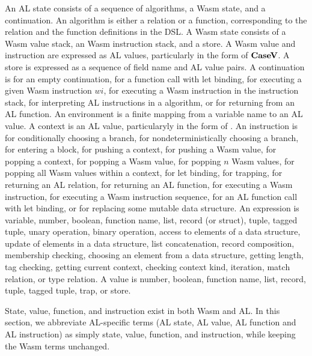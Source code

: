 An AL state consists of a sequence of algorithms, a Wasm state, and a
continuation.
An algorithm is either a relation or a function, corresponding to the relation
and the function definitions in the DSL.
A Wasm state consists of a Wasm value stack, an Wasm instruction stack, and a
store.
A Wasm value and instruction are expressed as AL values, particularly in the
form of $\textbf{CaseV}$.
A store is expressed as a sequence of field name and AL value pairs.
A continuation is \mt{} for an empty continuation, \call{} for a function call
with let binding, \exe{} for executing a given Wasm instruction $wi$, \wasm{}
for executing a Wasm instruction in the instruction stack, \algo{} for
interpreting AL instructions in a algorithm, or \ret{} for returning from an AL
function.
An environment is a finite mapping from a variable name to an AL value.
A context is an AL value, particularyly in the form of \casev{}.
An instruction is \ifi{} for conditionally choosing a branch, \eitheri{} for
nondeterministically choosing a branch, \enteri{} for entering a block,
\pushctxi{} for pushing a context, \pushi{} for pushing a Wasm value,
\popctxi{} for popping a context, \popi{} for popping a Wasm value, \popni{}
for popping $n$ Wasm values, \popalli{} for popping all Wasm values within a
context,  for let binding, \trapi{} for trapping, \returnreli{} for
returning an AL relation, \returnfunci{} for returning an AL function,
\executei{} for executing a Wasm instruction, \executeseqi{} for executing a
Wasm instruction sequence, \calli{} for an AL function call with let binding,
or \replacei{} for replacing some mutable data structure.
An expression is variable, number, boolean, function name, list, record (or
struct), tuple, tagged tuple, unary operation, binary operation, access to
elements of a data structure, update of elements in a data structure, list
concatenation, record composition, membership checking, choosing an element from
a data structure, getting length, tag checking, getting current context,
checking context kind, iteration, match relation, or type relation.
A value is number, boolean, function name, list, record, tuple, tagged tuple,
trap, or store.


State, value, function, and instruction exist in both Wasm and AL. In this
section, we abbreviate AL-specific terms (AL state, AL value, AL function and
AL instruction) as simply state, value, function, and instruction, while
keeping the Wasm terms unchanged.




